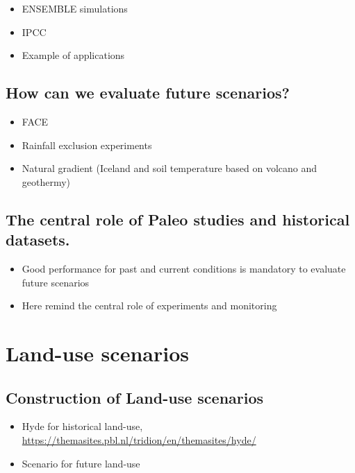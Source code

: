 \documentclass[
  12pt,
  oneside]{book}
\providecommand{\tightlist}{%
  \setlength{\itemsep}{0pt}\setlength{\parskip}{0pt}}
\begin{document}
\begin{itemize}
\tightlist
\item
  ENSEMBLE simulations
\item
  IPCC
\item
  Example of applications
\end{itemize}

\hypertarget{how-can-we-evaluate-future-scenarios}{%
\subsection{How can we evaluate future scenarios?}\label{how-can-we-evaluate-future-scenarios}}

\begin{itemize}
\tightlist
\item
  FACE
\item
  Rainfall exclusion experiments
\item
  Natural gradient (Iceland and soil temperature based on volcano and geothermy)
\end{itemize}

\hypertarget{the-central-role-of-paleo-studies-and-historical-datasets.}{%
\subsection{The central role of Paleo studies and historical datasets.}\label{the-central-role-of-paleo-studies-and-historical-datasets.}}

\begin{itemize}
\tightlist
\item
  Good performance for past and current conditions is mandatory to evaluate future scenarios
\item
  Here remind the central role of experiments and monitoring
\end{itemize}

\hypertarget{land-use-scenarios}{%
\section{Land-use scenarios}\label{land-use-scenarios}}

\hypertarget{construction-of-land-use-scenarios}{%
\subsection{Construction of Land-use scenarios}\label{construction-of-land-use-scenarios}}

\begin{itemize}
\tightlist
\item
  Hyde for historical land-use, \url{https://themasites.pbl.nl/tridion/en/themasites/hyde/}
\item
  Scenario for future land-use
\end{itemize}
\end{document}
